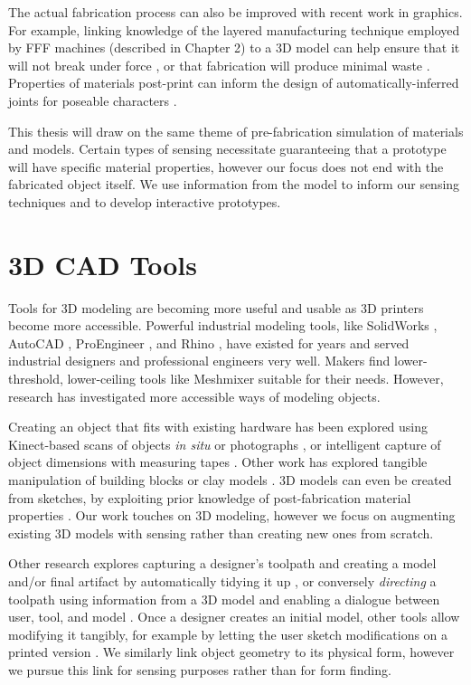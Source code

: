     The actual fabrication process can also be improved with recent work in graphics. For example, linking knowledge of the layered manufacturing technique employed by FFF machines (described in Chapter 2) to a 3D model can help ensure that it will not break under force \cite{umetani-strength}, or that fabrication will produce minimal waste \cite{schmidt-support}. Properties of materials post-print can inform the design of automatically-inferred joints for poseable characters \cite{bacher-posable,cali-articulated}.
    
    This thesis will draw on the same theme of pre-fabrication simulation of materials and models. Certain types of sensing necessitate guaranteeing that a prototype will have specific material properties, however our focus does not end with the fabricated object itself. We use information from the model to inform our sensing techniques and to develop interactive prototypes.
    
\section{3D CAD Tools}
    Tools for 3D modeling are becoming more useful and usable as 3D printers become more accessible. Powerful industrial modeling tools, like SolidWorks \cite{solidworks}, AutoCAD \cite{autocad}, ProEngineer \cite{proe}, and Rhino \cite{rhino}, have existed for years and served industrial designers and professional engineers very well. Makers find lower-threshold, lower-ceiling tools like Meshmixer \cite{schmidt-meshmixer} suitable for their needs. However, research has investigated more accessible ways of modeling objects.
    
    Creating an object that fits with existing hardware has been explored using Kinect-based scans of objects \emph{in situ} \cite{molyneaux-kinectfusion, weichel-mixfab} or photographs \cite{lau-modeling}, or intelligent capture of object dimensions with measuring tapes \cite{lee-handscape,weichel-spata}. Other work has explored tangible manipulation of building blocks \cite{anderson-tangible, gupta-duplotrack} or clay models \cite{savage-mmarks}. 3D models can even be created from sketches, by exploiting prior knowledge of post-fabrication material properties \cite{mori-plushie, saul-sketchchair}. Our work touches on 3D modeling, however we focus on augmenting existing 3D models with sensing rather than creating new ones from scratch.
    
    Other research explores capturing a designer's toolpath and creating a model and/or final artifact by automatically tidying it up \cite{willis-interactive, mueller-constructable, mueller-laserorigami}, or conversely \emph{directing} a toolpath using information from a 3D model and enabling a dialogue between user, tool, and model \cite{zoran-freed}. Once a designer creates an initial model, other tools allow modifying it tangibly, for example by letting the user sketch modifications on a printed version \cite{song-modelcraft-tochi}. We similarly link object geometry to its physical form, however we pursue this link for sensing purposes rather than for form finding.
    
